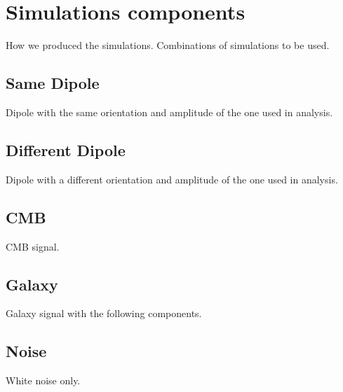 \section{Simulations components}
\label{sec:simulations_components}

How we produced the simulations.
Combinations of simulations to be used.

\subsection{Same Dipole}

Dipole with the same orientation and amplitude of the one used in analysis.

\subsection{Different Dipole}

Dipole with a different orientation and amplitude of the one used in analysis.

\subsection{CMB}

CMB signal.

\subsection{Galaxy}

Galaxy signal with the following components.

\subsection{Noise}

White noise only.
